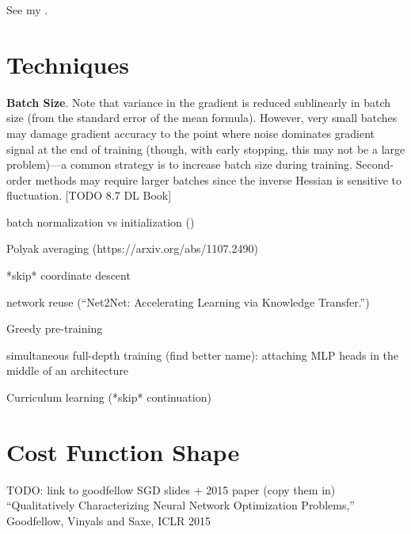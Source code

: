 \documentclass{article}
\begin{document}
See my .

\section{Techniques}

\noindent
\textbf{Batch Size}. Note that variance in the gradient is reduced sublinearly in batch size (from the standard error of the mean formula). However, very small batches may damage gradient accuracy to the point where noise dominates gradient signal at the end of training (though, with early stopping, this may not be a large problem)---a common strategy is to increase batch size during training. Second-order methods may require larger batches since the inverse Hessian is sensitive to fluctuation.
[TODO 8.7 DL Book]

batch normalization vs initialization ()

Polyak averaging (https://arxiv.org/abs/1107.2490)

*skip* coordinate descent

network reuse (``Net2Net: Accelerating Learning via
Knowledge Transfer.'')

Greedy pre-training

simultaneous full-depth training (find better name): attaching MLP heads in the middle of an architecture

Curriculum learning (*skip* continuation)

\section{Cost Function Shape}

TODO: link to goodfellow SGD slides + 2015 paper (copy them in)
``Qualitatively Characterizing Neural Network
Optimization Problems,''
Goodfellow, Vinyals and Saxe, ICLR 2015
\end{document}
